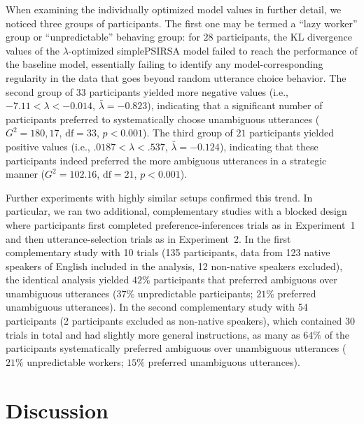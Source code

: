 \documentclass[11pt,a4paper]{article}
\begin{document}
When examining the individually optimized model values in further detail, we noticed three groups of participants. 
The first one may be termed a ``lazy worker'' group or ``unpredictable'' behaving group:
for $28$ participants, the KL divergence values of the $\lambda$-optimized simplePSIRSA model failed to reach the performance of the baseline model, essentially failing to identify any model-corresponding regularity in the data that goes beyond random utterance choice behavior.
The second group of $33$ participants yielded more negative values (i.e., $-7.11<\lambda<-0.014$, $\bar{\lambda}=-0.823$), indicating that a significant number of participants preferred to systematically choose unambiguous utterances ($G^2=180,17$, $\textrm{df}=33$, $p<0.001$). 
The third group of $21$ participants yielded positive values (i.e., $.0187<\lambda<.537$, $\bar{\lambda}=-0.124$), indicating that these participants indeed preferred the more ambiguous utterances in a strategic manner ($G^2=102.16$, $\textrm{df}=21$, $p<0.001$).


Further experiments with highly similar setups confirmed this trend.
In particular, we ran two additional, complementary studies with a blocked design where participants first completed preference-inferences trials as in Experiment~1 and then utterance-selection trials as in Experiment~2. 
In the first complementary study with 10 trials (135 participants, data from 123 native speakers of English included in the analysis, 12 non-native speakers excluded), the identical analysis yielded $42\%$ participants that preferred ambiguous over unambiguous utterances ($37\%$ unpredictable participants; $21\%$ preferred unambiguous utterances). 
In the second complementary study with 54 participants (2 participants excluded as non-native speakers), which contained 30 trials in total and had slightly more general instructions, as many as $64\%$ of the participants systematically preferred ambiguous over unambiguous utterances ($21\%$ unpredictable workers; $15\%$ preferred unambiguous utterances). 



\section{Discussion} \label{discussion}

\end{document}
